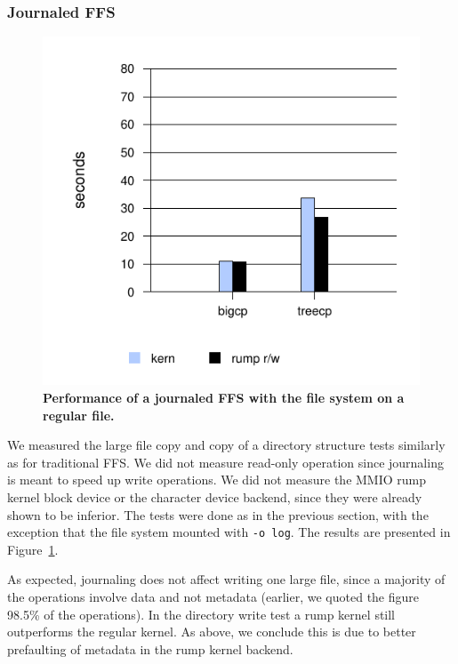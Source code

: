 \subsubsection*{Journaled FFS}

\begin{figure}[t]
\includegraphics{ffsjournal}
\caption[Performance of a journaled FFS with the file system on a regular file]{
\textbf{Performance of a journaled FFS with the file system on a regular file.}
}
\label{fig:ffsjournal}
\end{figure}

We measured the large file copy and copy of a directory structure
tests similarly as for traditional FFS.  We did not measure read-only
operation since journaling is meant to speed up write operations.
We did not measure the MMIO rump kernel block device or the character
device backend, since they were already shown to be inferior.  The tests
were done as in the previous section, with the exception that the file
system mounted with \texttt{-o log}.  The results are presented in
Figure~\ref{fig:ffsjournal}.

As expected, journaling does not affect writing one large file, since
a majority of the operations involve data and not metadata (earlier, we
quoted the figure 98.5\% of the operations).  In the
directory write test a rump kernel still outperforms the regular kernel.
As above, we conclude this is due to better prefaulting of metadata
in the rump kernel backend.

